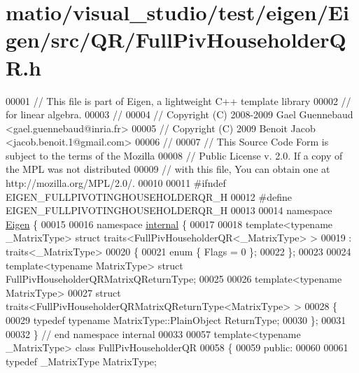 \hypertarget{matio_2visual__studio_2test_2eigen_2_eigen_2src_2_q_r_2_full_piv_householder_q_r_8h_source}{}\section{matio/visual\+\_\+studio/test/eigen/\+Eigen/src/\+Q\+R/\+Full\+Piv\+Householder\+QR.h}
\label{matio_2visual__studio_2test_2eigen_2_eigen_2src_2_q_r_2_full_piv_householder_q_r_8h_source}

\begin{DoxyCode}
00001 \textcolor{comment}{// This file is part of Eigen, a lightweight C++ template library}
00002 \textcolor{comment}{// for linear algebra.}
00003 \textcolor{comment}{//}
00004 \textcolor{comment}{// Copyright (C) 2008-2009 Gael Guennebaud <gael.guennebaud@inria.fr>}
00005 \textcolor{comment}{// Copyright (C) 2009 Benoit Jacob <jacob.benoit.1@gmail.com>}
00006 \textcolor{comment}{//}
00007 \textcolor{comment}{// This Source Code Form is subject to the terms of the Mozilla}
00008 \textcolor{comment}{// Public License v. 2.0. If a copy of the MPL was not distributed}
00009 \textcolor{comment}{// with this file, You can obtain one at http://mozilla.org/MPL/2.0/.}
00010 
00011 \textcolor{preprocessor}{#ifndef EIGEN\_FULLPIVOTINGHOUSEHOLDERQR\_H}
00012 \textcolor{preprocessor}{#define EIGEN\_FULLPIVOTINGHOUSEHOLDERQR\_H}
00013 
00014 \textcolor{keyword}{namespace }\hyperlink{namespace_eigen}{Eigen} \{ 
00015 
00016 \textcolor{keyword}{namespace }\hyperlink{namespaceinternal}{internal} \{
00017 
00018 \textcolor{keyword}{template}<\textcolor{keyword}{typename} \_MatrixType> \textcolor{keyword}{struct }traits<FullPivHouseholderQR<\_MatrixType> >
00019  : traits<\_MatrixType>
00020 \{
00021   \textcolor{keyword}{enum} \{ Flags = 0 \};
00022 \};
00023 
00024 \textcolor{keyword}{template}<\textcolor{keyword}{typename} MatrixType> \textcolor{keyword}{struct }FullPivHouseholderQRMatrixQReturnType;
00025 
00026 \textcolor{keyword}{template}<\textcolor{keyword}{typename} MatrixType>
00027 \textcolor{keyword}{struct }traits<FullPivHouseholderQRMatrixQReturnType<MatrixType> >
00028 \{
00029   \textcolor{keyword}{typedef} \textcolor{keyword}{typename} MatrixType::PlainObject ReturnType;
00030 \};
00031 
00032 \} \textcolor{comment}{// end namespace internal}
00033 
00057 \textcolor{keyword}{template}<\textcolor{keyword}{typename} \_MatrixType> \textcolor{keyword}{class }FullPivHouseholderQR
00058 \{
00059   \textcolor{keyword}{public}:
00060 
00061     \textcolor{keyword}{typedef} \_MatrixType MatrixType;

\end{DoxyCode}
